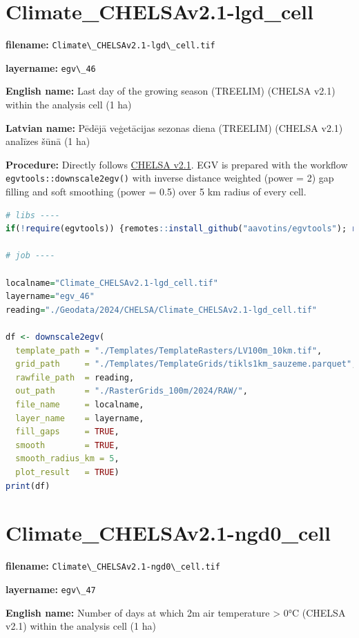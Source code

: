 \documentclass[
]{book}
\newcommand{\passthrough}[1]{#1}
\begin{document}
\section{Climate\_CHELSAv2.1-lgd\_cell}\label{ch06.046}

\textbf{filename:} \passthrough{\lstinline!Climate\_CHELSAv2.1-lgd\_cell.tif!}

\textbf{layername:} \passthrough{\lstinline!egv\_46!}

\textbf{English name:} Last day of the growing season (TREELIM) (CHELSA v2.1) within the analysis cell (1 ha)

\textbf{Latvian name:} Pēdējā veģetācijas sezonas diena (TREELIM) (CHELSA v2.1) analīzes šūnā (1 ha)

\textbf{Procedure:} Directly follows \hyperref[Ch04.11]{CHELSA v2.1}. EGV is prepared with the
workflow \passthrough{\lstinline!egvtools::downscale2egv()!} with inverse distance weighted (power = 2)
gap filling and soft smoothing (power = 0.5) over 5 km radius of every cell.

\begin{lstlisting}[language=R]
# libs ----
if(!require(egvtools)) {remotes::install_github("aavotins/egvtools"); require(egvtools)}

# job ----

localname="Climate_CHELSAv2.1-lgd_cell.tif"
layername="egv_46"
reading="./Geodata/2024/CHELSA/Climate_CHELSAv2.1-lgd_cell.tif"

df <- downscale2egv(
  template_path = "./Templates/TemplateRasters/LV100m_10km.tif",
  grid_path     = "./Templates/TemplateGrids/tikls1km_sauzeme.parquet",
  rawfile_path  = reading,
  out_path      = "./RasterGrids_100m/2024/RAW/",
  file_name     = localname,
  layer_name    = layername,
  fill_gaps     = TRUE,
  smooth        = TRUE,
  smooth_radius_km = 5,
  plot_result   = TRUE)
print(df)
\end{lstlisting}

\section{Climate\_CHELSAv2.1-ngd0\_cell}\label{ch06.047}

\textbf{filename:} \passthrough{\lstinline!Climate\_CHELSAv2.1-ngd0\_cell.tif!}

\textbf{layername:} \passthrough{\lstinline!egv\_47!}

\textbf{English name:} Number of days at which 2m air temperature \textgreater{} 0°C (CHELSA v2.1) within the analysis cell (1 ha)
\end{document}
